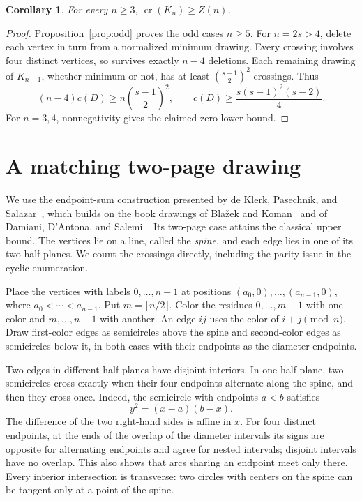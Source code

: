 \documentclass[11pt,a4paper]{article}
\newtheorem{corollary}[theorem]{Corollary}
\theoremstyle{remark}
\numberwithin{equation}{section}
\newcommand{\crn}{\operatorname{cr}}
\begin{document}
\begin{corollary}\label{cor:lower}
For every \(n\ge3\), \(\crn(K_n)\ge Z(n)\).
\end{corollary}

\begin{proof}
Proposition~\ref{prop:odd} proves the odd cases \(n\ge5\).
For \(n=2s>4\), delete each vertex in turn from a normalized
minimum drawing. Every crossing involves four distinct vertices,
so survives exactly \(n-4\) deletions. Each remaining drawing of
\(K_{n-1}\), whether minimum or not, has at least
\(\binom{s-1}{2}^{2}\) crossings. Thus
\[
(n-4)c(D)\ge n\binom{s-1}{2}^{\!2},
\qquad
c(D)\ge\frac{s(s-1)^2(s-2)}4.
\]
For \(n=3,4\), nonnegativity gives the claimed zero lower bound.
\end{proof}

\section{A matching two-page drawing}\label{sec:upper}

We use the endpoint-sum construction presented by de Klerk, Pasechnik,
and Salazar~\cite[Section~5.1]{DPSBookPreprint}, which builds on the
book drawings of Bla\v{z}ek and Koman~\cite{BlazekKoman1964} and of
Damiani, D'Antona, and Salemi~\cite{DamianiEtAl1994}.
Its two-page case attains the classical upper bound.
The vertices lie on a line, called the \emph{spine}, and each edge lies
in one of its two half-planes. We count the crossings directly,
including the parity issue in the cyclic enumeration.

Place the vertices with labels \(0,\ldots,n-1\) at positions
\((a_0,0),\ldots,(a_{n-1},0)\), where
\(a_0<\cdots<a_{n-1}\). Put \(m=\lfloor n/2\rfloor\).
Color the residues \(0,\ldots,m-1\) with one color and
\(m,\ldots,n-1\) with another. An edge \(ij\) uses the color of
\(i+j\pmod n\). Draw first-color edges as semicircles above the
spine and second-color edges as semicircles below it, in both cases
with their endpoints as the diameter endpoints.

Two edges in different half-planes have disjoint interiors. In one
half-plane, two semicircles cross exactly when their four endpoints
alternate along the spine, and then they cross once. Indeed, the
semicircle with endpoints \(a<b\) satisfies
\[
 y^2=(x-a)(b-x).
\]
The difference of the two right-hand sides is affine in \(x\).
For four distinct endpoints, at the ends of the overlap of the
diameter intervals its signs are opposite for alternating endpoints and agree for nested intervals;
disjoint intervals have no overlap. This also shows that arcs
sharing an endpoint meet only there. Every interior
intersection is transverse: two circles with centers on the spine
can be tangent only at a point of the spine.
\end{document}
